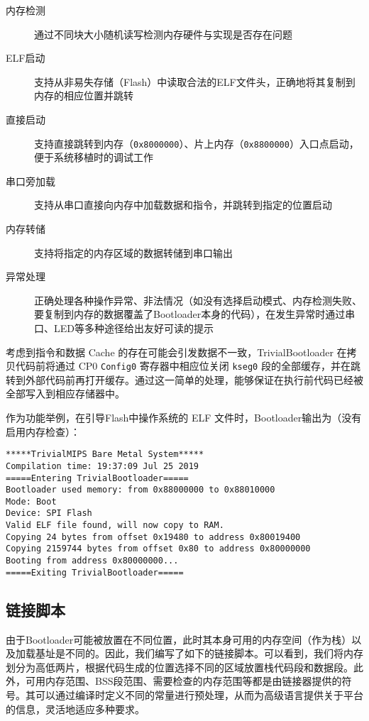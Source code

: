 \begin{description}
    \item[内存检测] 通过不同块大小随机读写检测内存硬件与实现是否存在问题
    \item[ELF启动] 支持从非易失存储（Flash）中读取合法的ELF文件头，正确地将其复制到内存的相应位置并跳转
    \item[直接启动] 支持直接跳转到内存（\texttt{0x8000000}）、片上内存（\texttt{0x8800000}）入口点启动，便于系统移植时的调试工作
    \item[串口旁加载] 支持从串口直接向内存中加载数据和指令，并跳转到指定的位置启动
    \item[内存转储] 支持将指定的内存区域的数据转储到串口输出
    \item[异常处理] 正确处理各种操作异常、非法情况（如没有选择启动模式、内存检测失败、要复制到内存的数据覆盖了Bootloader本身的代码），在发生异常时通过串口、LED等多种途径给出友好可读的提示
\end{description}

考虑到指令和数据 Cache 的存在可能会引发数据不一致，TrivialBootloader 在拷贝代码前将通过 CP0 \texttt{Config0} 寄存器中相应位关闭 \texttt{kseg0} 段的全部缓存，并在跳转到外部代码前再打开缓存。通过这一简单的处理，能够保证在执行前代码已经被全部写入到相应存储器中。

作为功能举例，在引导Flash中操作系统的 ELF 文件时，Bootloader输出为（没有启用内存检查）：
\begin{verbatim}
*****TrivialMIPS Bare Metal System*****
Compilation time: 19:37:09 Jul 25 2019
=====Entering TrivialBootloader=====
Bootloader used memory: from 0x88000000 to 0x88010000
Mode: Boot
Device: SPI Flash
Valid ELF file found, will now copy to RAM.
Copying 24 bytes from offset 0x19480 to address 0x80019400
Copying 2159744 bytes from offset 0x80 to address 0x80000000
Booting from address 0x80000000...
=====Exiting TrivialBootloader=====
\end{verbatim}

\subsection{链接脚本}

由于Bootloader可能被放置在不同位置，此时其本身可用的内存空间（作为栈）以及加载基址是不同的。因此，我们编写了如下的链接脚本。可以看到，我们将内存划分为高低两片，根据代码生成的位置选择不同的区域放置栈代码段和数据段。此外，可用内存范围、BSS段范围、需要检查的内存范围等都是由链接器提供的符号。其可以通过编译时定义不同的常量进行预处理，从而为高级语言提供关于平台的信息，灵活地适应多种要求。


